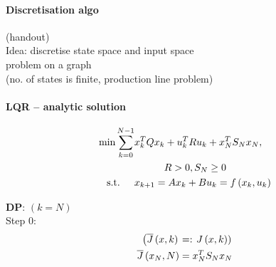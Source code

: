 \begin{figure}[H]
    \centering
    \def\svgwidth{0.8\columnwidth}
    
\end{figure}

\paragraph{Discretisation algo} (handout) \\
Idea: discretise state space and input space\\
\lat{} problem on a graph\\
(no. of states is finite, production line problem)

\paragraph{LQR -- analytic solution}
\begin{align*}
    \min \sum_{k=0}^{N-1} &x_k^T Q x_k + u_k^T R u_k + x_N^T S_N x_N ,\\
    &\qquad \quad R>0, S_N \geq 0\\
    \textnormal{s.t. } \quad & x_{k+1} = Ax_k + Bu_k = f \left( x_k,u_k \right)
\end{align*}

\textbf{DP}: $(k=N)$\\
Step 0:
\begin{align*}
    \left( \Jbar{x,k} \right. &=: \left. J \paren{x,k} \right)\\
    \Jbar{x_N,N} &= x^T_NS_Nx_N
\end{align*}

